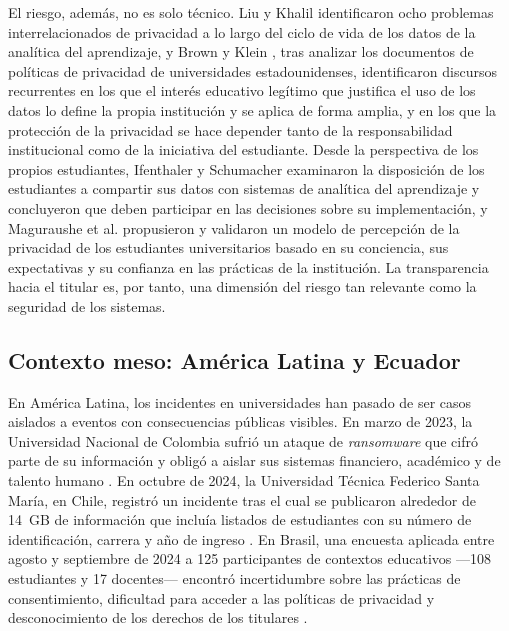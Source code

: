 El riesgo, además, no es solo técnico. Liu y Khalil \cite{liu2023privacy} identificaron ocho problemas interrelacionados de privacidad a lo largo del ciclo de vida de los datos de la analítica del aprendizaje, y Brown y Klein \cite{brown2020whose}, tras analizar los documentos de políticas de privacidad de universidades estadounidenses, identificaron discursos recurrentes en los que el interés educativo legítimo que justifica el uso de los datos lo define la propia institución y se aplica de forma amplia, y en los que la protección de la privacidad se hace depender tanto de la responsabilidad institucional como de la iniciativa del estudiante. Desde la perspectiva de los propios estudiantes, Ifenthaler y Schumacher \cite{ifenthaler2016student} examinaron la disposición de los estudiantes a compartir sus datos con sistemas de analítica del aprendizaje y concluyeron que deben participar en las decisiones sobre su implementación, y Maguraushe et al. \cite{maguraushe2024model} propusieron y validaron un modelo de percepción de la privacidad de los estudiantes universitarios basado en su conciencia, sus expectativas y su confianza en las prácticas de la institución. La transparencia hacia el titular es, por tanto, una dimensión del riesgo tan relevante como la seguridad de los sistemas.

\subsection{Contexto meso: América Latina y Ecuador}

En América Latina, los incidentes en universidades han pasado de ser casos aislados a eventos con consecuencias públicas visibles. En marzo de 2023, la Universidad Nacional de Colombia sufrió un ataque de \textit{ransomware} que cifró parte de su información y obligó a aislar sus sistemas financiero, académico y de talento humano \cite{semana2023unal}. En octubre de 2024, la Universidad Técnica Federico Santa María, en Chile, registró un incidente tras el cual se publicaron alrededor de 14~GB de información que incluía listados de estudiantes con su número de identificación, carrera y año de ingreso \cite{cnnchile2024usm}. En Brasil, una encuesta aplicada entre agosto y septiembre de 2024 a 125 participantes de contextos educativos ---108 estudiantes y 17 docentes--- encontró incertidumbre sobre las prácticas de consentimiento, dificultad para acceder a las políticas de privacidad y desconocimiento de los derechos de los titulares \cite{correia2025privacy}.

